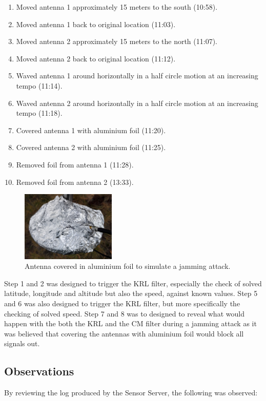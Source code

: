 \documentclass[12pt,english,a4paper]{report}
\begin{document}
\begin{enumerate}
  \item Moved antenna 1 approximately 15 meters to the south (10:58).
  \item Moved antenna 1 back to original location (11:03).
  \item Moved antenna 2 approximately 15 meters to the north (11:07).
  \item Moved antenna 2 back to original location (11:12).
  \item Waved antenna 1 around horizontally in a half circle motion at an increasing tempo (11:14).
  \item Waved antenna 2 around horizontally in a half circle motion at an increasing tempo (11:18).
  \item Covered antenna 1 with aluminium foil (11:20).
  \item Covered antenna 2 with aluminium foil (11:25).
  \item Removed foil from antenna 1 (11:28).
  \item Removed foil from antenna 2 (13:33).
\end{enumerate}
\newpage

\begin{figure}
  \centering
  \includegraphics[width=0.40\textwidth]{antenna_foil_cover.jpg}
  \caption[Antenna covered in aluminium foil]
   {Antenna covered in aluminium foil to simulate a jamming attack.}
\end{figure} 

Step 1 and 2 was designed to trigger the KRL filter, especially the check of solved latitude, longitude and altitude but also the speed, against known values. Step 5 and 6 was also designed to trigger the KRL filter, but more specifically the checking of solved speed. Step 7 and 8 was to designed to reveal what would happen with the both the KRL and the CM filter during a jamming attack as it was believed that covering the antennas with aluminium foil would block all signals out.

\subsection{Observations}\label{observations}
By reviewing the log produced by the Sensor Server, the following was observed:
\end{document}
